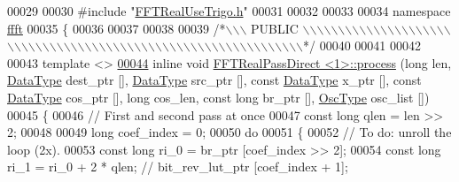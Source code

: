 \begin{DoxyCode}
00029 
00030 \textcolor{preprocessor}{#include    "\hyperlink{a00106}{FFTRealUseTrigo.h}"}
00031 
00032 
00033 
00034 \textcolor{keyword}{namespace }\hyperlink{a00142}{ffft}
00035 \{
00036 
00037 
00038 
00039 \textcolor{comment}{/*\(\backslash\)\(\backslash\)\(\backslash\) PUBLIC \(\backslash\)\(\backslash\)\(\backslash\)\(\backslash\)\(\backslash\)\(\backslash\)\(\backslash\)\(\backslash\)\(\backslash\)\(\backslash\)\(\backslash\)\(\backslash\)\(\backslash\)\(\backslash\)\(\backslash\)\(\backslash\)\(\backslash\)\(\backslash\)\(\backslash\)\(\backslash\)\(\backslash\)\(\backslash\)\(\backslash\)\(\backslash\)\(\backslash\)\(\backslash\)\(\backslash\)\(\backslash\)\(\backslash\)\(\backslash\)\(\backslash\)\(\backslash\)\(\backslash\)\(\backslash\)\(\backslash\)\(\backslash\)\(\backslash\)\(\backslash\)\(\backslash\)\(\backslash\)\(\backslash\)\(\backslash\)\(\backslash\)\(\backslash\)\(\backslash\)\(\backslash\)\(\backslash\)\(\backslash\)\(\backslash\)\(\backslash\)\(\backslash\)\(\backslash\)\(\backslash\)\(\backslash\)\(\backslash\)\(\backslash\)\(\backslash\)\(\backslash\)\(\backslash\)\(\backslash\)\(\backslash\)\(\backslash\)\(\backslash\)*/}
00040 
00041 
00042 
00043 \textcolor{keyword}{template} <>
\hypertarget{a00101_source_l00044}{}\hyperlink{a00013_a1aacd50efcaa443cacab727eb4c1fbe8}{00044} \textcolor{keyword}{inline} \textcolor{keywordtype}{void} \hyperlink{a00013}{FFTRealPassDirect <1>::process} (\textcolor{keywordtype}{long} len, 
      \hyperlink{a00013_a831663a8e0b1414e80f82cd3d18b5b6b}{DataType} dest\_ptr [], \hyperlink{a00013_a831663a8e0b1414e80f82cd3d18b5b6b}{DataType} src\_ptr [], \textcolor{keyword}{const} \hyperlink{a00013_a831663a8e0b1414e80f82cd3d18b5b6b}{DataType} x\_ptr [], \textcolor{keyword}{const} 
      \hyperlink{a00013_a831663a8e0b1414e80f82cd3d18b5b6b}{DataType} cos\_ptr [], \textcolor{keywordtype}{long} cos\_len, \textcolor{keyword}{const} \textcolor{keywordtype}{long} br\_ptr [], \hyperlink{a00020}{OscType} osc\_list [])
00045 \{
00046     \textcolor{comment}{// First and second pass at once}
00047     \textcolor{keyword}{const} \textcolor{keywordtype}{long}      qlen = len >> 2;
00048 
00049     \textcolor{keywordtype}{long}                coef\_index = 0;
00050     \textcolor{keywordflow}{do}
00051     \{
00052         \textcolor{comment}{// To do: unroll the loop (2x).}
00053         \textcolor{keyword}{const} \textcolor{keywordtype}{long}      ri\_0 = br\_ptr [coef\_index >> 2];
00054         \textcolor{keyword}{const} \textcolor{keywordtype}{long}      ri\_1 = ri\_0 + 2 * qlen; \textcolor{comment}{// bit\_rev\_lut\_ptr [coef\_index + 1];}

\end{DoxyCode}
